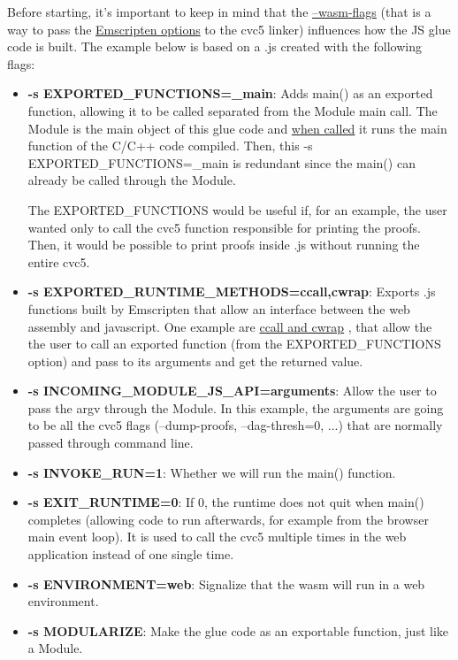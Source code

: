 \documentclass[12pt, a4paper]{article}
\begin{document}
Before starting, it's important to keep in mind that the
\href{https://github.com/cvc5/cvc5/blob/main/configure.sh}{--wasm-flags} (that
is a way to pass the
\href{https://github.com/emscripten-core/emscripten/blob/main/src/settings.js}{Emscripten
  options} to the cvc5 linker) influences how the JS glue code is built. The
example below is based on a .js created with the following flags:
\begin{itemize}
    \item \textbf{-s EXPORTED\_FUNCTIONS=\_main}: Adds \textsf{main()} as an
    exported function, allowing it to be called separated from the Module main 
    call. The Module is the main object of this glue code and \href{https://github.com/ufmg-smite/proof-visualizer/blob/main/frontend/src/components/VisualizerSmtDrawer/VisualizerSmtDrawer.tsx#L358-L366}{when called}
     it runs the main function of the C/C++ code compiled. Then, this -s 
     EXPORTED\_FUNCTIONS=\_main is redundant since the \textsf{main()} can 
     already be called through the Module.
    
    The EXPORTED\_FUNCTIONS would be useful if, for an example, the user wanted 
    only to call the cvc5 function responsible for printing the proofs. Then, it
    would be possible to print proofs inside .js without running the entire 
    cvc5.
    \item \textbf{-s EXPORTED\_RUNTIME\_METHODS=ccall,cwrap}: Exports .js 
    functions built by Emscripten that allow an interface between the web 
    assembly and javascript. One example are \href{https://emscripten.org/docs/porting/connecting_cpp_and_javascript/Interacting-with-code.html#calling-compiled-c-functions-from-javascript-using-ccall-cwrap}{ccall and cwrap}
    , that allow the the user to call an exported function (from the 
    EXPORTED\_FUNCTIONS option) and pass to its arguments and get the returned 
    value.
    \item \textbf{-s INCOMING\_MODULE\_JS\_API=arguments}: Allow the user to 
    pass the \textsf{argv} through the Module. In this example, the arguments 
    are going to be all the cvc5 flags (--dump-proofs, --dag-thresh=0, ...) that
     are normally passed through command line.
    \item \textbf{-s INVOKE\_RUN=1}: Whether we will run the \textsf{main()} function.
    \item \textbf{-s EXIT\_RUNTIME=0}: If 0, the runtime does not quit when
    \textsf{main()} completes (allowing code to run afterwards, for example from
    the browser main event loop). It is used to call the cvc5 multiple times in 
    the web application instead of one single time.
    \item \textbf{-s ENVIRONMENT=web}: Signalize that the wasm will run in a web environment.
    \item \textbf{-s MODULARIZE}: Make the glue code as an exportable function, just like a Module.
\end{itemize}
\end{document}
